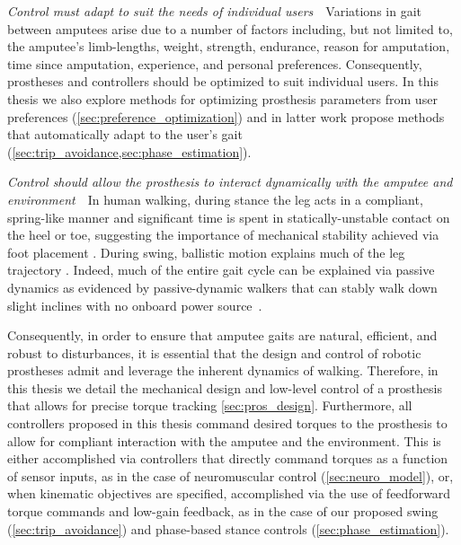 \begin{challenges}
    \item\label{chal:unique} \emph{Control must adapt to suit the needs of
    individual users}~~Variations in gait between amputees arise due to a number
    of factors including, but not limited to, the amputee's limb-lengths,
    weight, strength, endurance, reason for amputation, time since amputation,
    experience, and personal preferences. Consequently, prostheses and
    controllers should be optimized to suit individual users. In this thesis we
    also explore methods for optimizing prosthesis parameters from user
    preferences (\cref{sec:preference_optimization}) and in latter work propose
    methods that automatically adapt to the user's gait
    (\cref{sec:trip_avoidance,sec:phase_estimation}).

    \item\label{chal:dynamic} \emph{Control should allow the prosthesis to
    interact dynamically with the amputee and environment}~~In human walking,
    during stance the leg acts in a compliant, spring-like manner
    \citep{geyer2006compliant} and significant time is spent in
    statically-unstable contact on the heel or toe, suggesting the importance of
    mechanical stability achieved via foot placement \citep{perry2010gait}.
    During swing, ballistic motion explains much of the leg trajectory
    \citep{mochon1980ballistic}. Indeed, much of the entire gait cycle can be
    explained via passive dynamics as evidenced by passive-dynamic walkers that
    can stably walk down slight inclines with no onboard power
    source~\citep{mcgeer1990passive, collins2005efficient}.

    Consequently, in order to ensure that amputee gaits are natural, efficient,
    and robust to disturbances, it is essential that the design and control of
    robotic prostheses admit and leverage the inherent dynamics of walking.
    Therefore, in this thesis we detail the mechanical design and low-level
    control of a prosthesis that allows for precise torque tracking
    \cref{sec:pros_design}.  Furthermore, all controllers proposed in this
    thesis command desired torques to the prosthesis to allow for compliant
    interaction with the amputee and the environment. This is either
    accomplished via controllers that directly command torques as a function of
    sensor inputs, as in the case of neuromuscular control
    (\cref{sec:neuro_model}), or, when kinematic objectives are specified,
    accomplished via the use of feedforward torque commands and low-gain
    feedback, as in the case of our proposed swing (\cref{sec:trip_avoidance})
    and phase-based stance controls (\cref{sec:phase_estimation}).
\end{challenges}
